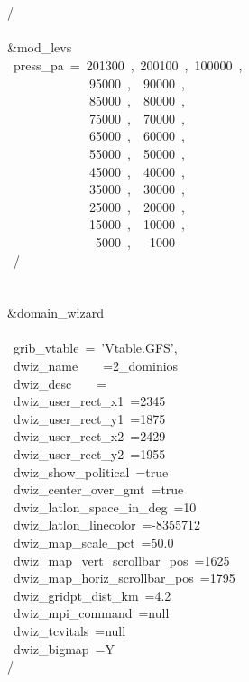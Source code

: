 \\
\\
/\\
\\
\&mod\_levs\\
~press\_pa~=~201300~,~200100~,~100000~,\\
~~~~~~~~~~~~~95000~,~~90000~,\\
~~~~~~~~~~~~~85000~,~~80000~,\\
~~~~~~~~~~~~~75000~,~~70000~,\\
~~~~~~~~~~~~~65000~,~~60000~,\\
~~~~~~~~~~~~~55000~,~~50000~,\\
~~~~~~~~~~~~~45000~,~~40000~,\\
~~~~~~~~~~~~~35000~,~~30000~,\\
~~~~~~~~~~~~~25000~,~~20000~,\\
~~~~~~~~~~~~~15000~,~~10000~,\\
~~~~~~~~~~~~~~5000~,~~~1000\\
~/\\
\\
\\
\&domain\_wizard\\
\\
~grib\_vtable~=~'Vtable.GFS',\\
~dwiz\_name~~~~=2\_dominios\\
~dwiz\_desc~~~~=\\
~dwiz\_user\_rect\_x1~=2345\\
~dwiz\_user\_rect\_y1~=1875\\
~dwiz\_user\_rect\_x2~=2429\\
~dwiz\_user\_rect\_y2~=1955\\
~dwiz\_show\_political~=true\\
~dwiz\_center\_over\_gmt~=true\\
~dwiz\_latlon\_space\_in\_deg~=10\\
~dwiz\_latlon\_linecolor~=-8355712\\
~dwiz\_map\_scale\_pct~=50.0\\
~dwiz\_map\_vert\_scrollbar\_pos~=1625\\
~dwiz\_map\_horiz\_scrollbar\_pos~=1795\\
~dwiz\_gridpt\_dist\_km~=4.2\\
~dwiz\_mpi\_command~=null\\
~dwiz\_tcvitals~=null\\
~dwiz\_bigmap~=Y\\
/\\

